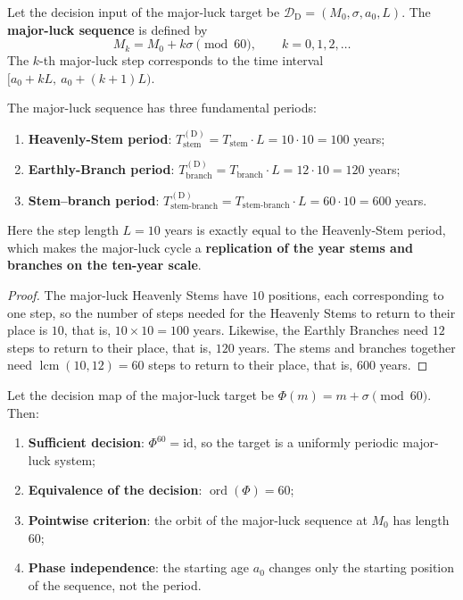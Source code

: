 \begin{definition}\label{def:dayun_sequence_yijing}
Let the decision input of the major-luck target be $\mathcal D_{\mathrm{D}}=(M_0,\sigma,a_0,L)$. The \textbf{major-luck sequence} is defined by
\[
M_k=M_0+k\sigma\pmod{60},\qquad k=0,1,2,\dots
\]
The $k$-th major-luck step corresponds to the time interval $[a_0+kL,\ a_0+(k+1)L)$.
\end{definition}

\begin{theorem}\label{thm:dayun_three_periods_yijing}
The major-luck sequence has three fundamental periods:
\begin{enumerate}[label=(\roman*)]
    \item \textbf{Heavenly-Stem period}: $T_{\text{stem}}^{\mathrm{(D)}}=T_{\text{stem}}\cdot L=10\cdot 10=100$ years;
    \item \textbf{Earthly-Branch period}: $T_{\text{branch}}^{\mathrm{(D)}}=T_{\text{branch}}\cdot L=12\cdot 10=120$ years;
    \item \textbf{Stem--branch period}: $T_{\text{stem-branch}}^{\mathrm{(D)}}=T_{\text{stem-branch}}\cdot L=60\cdot 10=600$ years.
\end{enumerate}
Here the step length $L=10$ years is exactly equal to the Heavenly-Stem period, which makes the major-luck cycle a \textbf{replication of the year stems and branches on the ten-year scale}.
\end{theorem}

\begin{proof}
The major-luck Heavenly Stems have $10$ positions, each corresponding to one step, so the number of steps needed for the Heavenly Stems to return to their place is $10$, that is, $10\times 10=100$ years. Likewise, the Earthly Branches need $12$ steps to return to their place, that is, $120$ years. The stems and branches together need $\operatorname{lcm}(10,12)=60$ steps to return to their place, that is, $600$ years.
\end{proof}

\begin{proposition}\label{thm:dayun_periodicity_decision_yijing}
Let the decision map of the major-luck target be $\Phi(m)=m+\sigma\pmod{60}$. Then:
\begin{enumerate}[label=(\Alph*)]
    \item \textbf{Sufficient decision}: $\Phi^{60}=\mathrm{id}$, so the target is a uniformly periodic major-luck system;
    \item \textbf{Equivalence of the decision}: $\operatorname{ord}(\Phi)=60$;
    \item \textbf{Pointwise criterion}: the orbit of the major-luck sequence at $M_0$ has length $60$;
    \item \textbf{Phase independence}: the starting age $a_0$ changes only the starting position of the sequence, not the period.
\end{enumerate}
\end{proposition}

